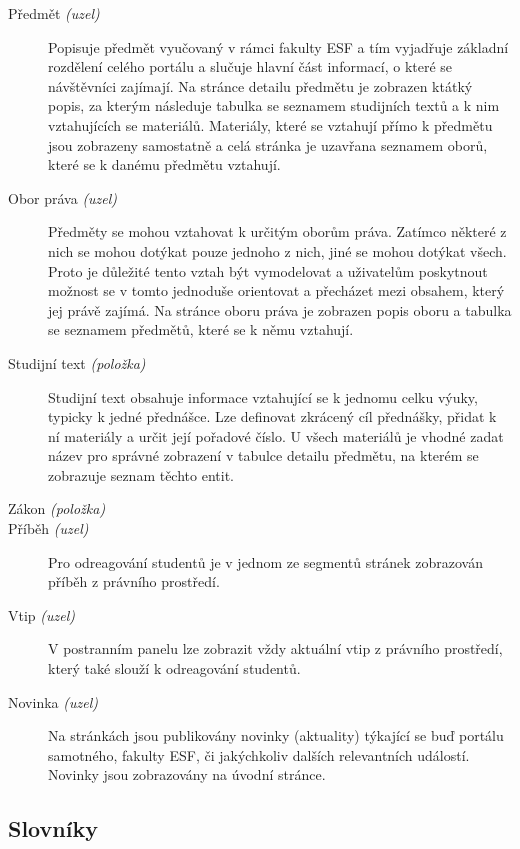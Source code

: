 \begin{description}
  \item[Předmět \emph{(uzel)}] Popisuje předmět vyučovaný v rámci fakulty ESF a tím vyjadřuje základní rozdělení celého portálu a slučuje hlavní část informací, o které se návštěvníci zajímají. Na stránce detailu předmětu je zobrazen ktátký popis, za kterým následuje tabulka se seznamem studijních textů a k nim vztahujících se materiálů. Materiály, které se vztahují přímo k předmětu jsou zobrazeny samostatně a celá stránka je uzavřana seznamem oborů, které se k danému předmětu vztahují.

  \item[Obor práva \emph{(uzel)}] Předměty se mohou vztahovat k určitým oborům práva. Zatímco některé z nich se mohou dotýkat pouze jednoho z nich, jiné se mohou dotýkat všech. Proto je důležité tento vztah být vymodelovat a uživatelům poskytnout možnost se v tomto jednoduše orientovat a přecházet mezi obsahem, který jej právě zajímá. Na stránce oboru práva je zobrazen popis oboru a tabulka se seznamem předmětů, které se k němu vztahují.

  \item[Studijní text \emph{(položka)}] Studijní text obsahuje informace vztahující se k jednomu celku výuky, typicky k jedné přednášce. Lze definovat zkrácený cíl přednášky, přidat k ní materiály a určit její pořadové číslo. U všech materiálů je vhodné zadat název pro správné zobrazení v tabulce detailu předmětu, na kterém se zobrazuje seznam těchto entit.

  \item[Zákon \emph{(položka)}]

  \item[Příběh \emph{(uzel)}] Pro odreagování studentů je v jednom ze segmentů stránek zobrazován příběh z právního prostředí. 

  \item[Vtip \emph{(uzel)}] V postranním panelu lze zobrazit vždy aktuální vtip z právního prostředí, který také slouží k odreagování studentů. 

  \item[Novinka \emph{(uzel)}] Na stránkách jsou publikovány novinky (aktuality) týkající se buď portálu samotného, fakulty ESF, či jakýchkoliv dalších relevantních událostí. Novinky jsou zobrazovány na úvodní stránce. \\
\end{description}

\subsection{Slovníky}

